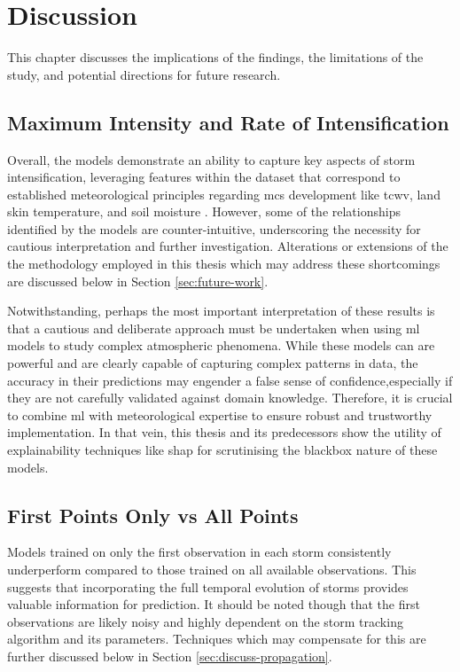 \chapter{Discussion}
\label{ch:discuss}

This chapter discusses the implications of the findings, the limitations of the study, and potential directions for future research.

\section{Maximum Intensity and Rate of Intensification}

Overall, the models demonstrate an ability to capture key aspects of storm intensification, leveraging features within the dataset that correspond to established meteorological principles regarding \acrshort{mcs} development like \acrfull{tcwv}, land skin temperature, and soil moisture \citep{Li2023,Taylor2017,Klein2020}. However, some of the relationships identified by the models are counter-intuitive, underscoring the necessity for cautious interpretation and further investigation. Alterations or extensions of the the methodology employed in this thesis which may address these shortcomings are discussed below in Section \ref{sec:future-work}.

Notwithstanding, perhaps the most important interpretation of these results is that a cautious and deliberate approach must be undertaken when using \acrshort{ml} models to study complex atmospheric phenomena. While these models can are powerful and are clearly capable of capturing complex patterns in data, the accuracy in their predictions may engender a false sense of confidence,especially if they are not carefully validated against domain knowledge. Therefore, it is crucial to combine \acrshort{ml} with meteorological expertise to ensure robust and trustworthy implementation. In that vein, this thesis and its predecessors show the utility of explainability techniques like \acrshort{shap} for scrutinising the \gls{blackbox} nature of these models.

\section{First Points Only vs All Points}

Models trained on only the first observation in each storm consistently underperform compared to those trained on all available observations. This suggests that incorporating the full temporal evolution of storms provides valuable information for prediction. It should be noted though that the first observations are likely noisy and highly dependent on the storm tracking algorithm and its parameters. Techniques which may compensate for this are further discussed below in Section \ref{sec:discuss-propagation}.

